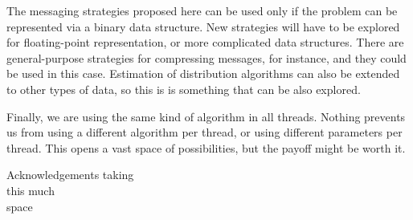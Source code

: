 \documentclass[sigconf]{acmart}\usepackage[]{graphicx}\usepackage[]{color}
\begin{document}
The messaging strategies proposed here can be used only if the problem
can be represented via a binary data structure. New strategies will
have to be explored for floating-point representation, or more
complicated data structures. There are general-purpose strategies for
compressing messages, for instance, and they could be used in this
case. Estimation of distribution algorithms can also be extended to
other types of data, so this is is something that can be also explored.

Finally, we are using the same kind of algorithm in all
threads. Nothing prevents us from using a different algorithm per
thread, or using different parameters per thread. This opens a vast
space of possibilities, but the payoff might be worth it.



\begin{acks}
Acknowledgements taking\\
this much\\
space

\end{acks}


 
\end{document}

